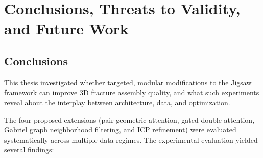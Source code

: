 \chapter{Conclusions, Threats to Validity, and Future Work}
\label{chap:ch8}

\section{Conclusions}

This thesis investigated whether targeted, modular modifications to the Jigsaw framework can improve 3D fracture assembly quality, and what such experiments reveal about the interplay between architecture, data, and optimization.

The four proposed extensions (pair geometric attention, gated double attention, Gabriel graph neighborhood filtering, and ICP refinement) were evaluated systematically across multiple data regimes. The experimental evaluation yielded several findings:

